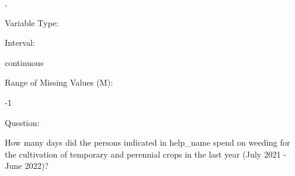 \documentclass[
]{article}
\begin{document}
,

\begin{minipage}[t]{0.3\linewidth}

\colorbox{mypink1}{}

\end{minipage}%
\begin{minipage}[t]{0.7\linewidth}

\colorbox{mypink1}{\makebox[\textwidth]{\strut\bfseries\color{black}  
 }}

\end{minipage}

\begin{minipage}[t]{0.3\linewidth}

Variable Type:

\end{minipage}%
\begin{minipage}[t]{0.7\linewidth}

\end{minipage}

\begin{minipage}[t]{0.3\linewidth}

Interval:

\end{minipage}%
\begin{minipage}[t]{0.7\linewidth}

continuous

\end{minipage}

\begin{minipage}[t]{0.3\linewidth}

Range of Missing Values (M):

\end{minipage}%
\begin{minipage}[t]{0.7\linewidth}

-1

\end{minipage}

\begin{minipage}[t]{0.3\linewidth}

Question:

\end{minipage}%
\begin{minipage}[t]{0.7\linewidth}

How many days did the persons indicated in help\_name spend on weeding
for the cultivation of temporary and perennial crops in the last year
(July 2021 - June 2022)?

\end{minipage}
\end{document}
